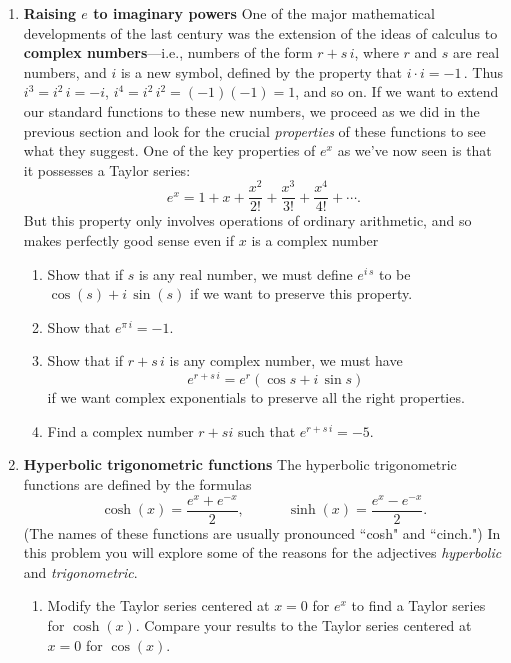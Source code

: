 \begin{enumerate}
\begin{enumerate}
\end{enumerate}
\item {\bf Raising $e$ to imaginary powers} One of the major mathematical developments of the
last century was the extension of the ideas of calculus to {\bf
  complex numbers}---i.e., numbers of the form
$r+s\,i$, where $r$ and $s$ are real numbers, and $i$ is a new symbol,
defined by the property that $i\cdot i=-1$\,.  Thus $i^3=i^2\,i=-i$,
$i^4=i^2\,i^2=(-1)(-1)=1$, and so on. If we want to extend our
standard functions to these new numbers, we proceed as we did in the
previous section and look for the crucial {\em properties} of these
functions to see what they suggest.  One of the key properties of
$e^x$ as we've now seen is that it possesses a Taylor series:
\[
e^x = 1 + x + \dfrac{x^2}{2!} + \dfrac{x^3}{3!} 
                + \dfrac{x^4}{4!} + \cdots .
\]
But this property only involves operations of ordinary arithmetic, and
so makes perfectly good sense even if $x$ is a complex number


  \begin{enumerate}
  \item Show that if $s$ is any real number, we must define $e^{i\,s}$ to
be $\cos(s)+i\,\sin(s)$ if we want to preserve this property.

  \item Show that $e^{\pi\,i}=-1$.

  \item Show that if $r+s\,i$ is any complex number, we must have
\[
e^{r+s\,i}=e^r(\cos{s}+i\,\sin{s})
\]
if we want complex exponentials to preserve all the right properties.

  \item Find a complex number $r+si$ such that $e^{r+s\,i}= -5$.


\end{enumerate}
\item {\bf Hyperbolic trigonometric functions}\index{$\cosh$}\index{$\sinh$} The hyperbolic trigonometric
functions are defined by the formulas
\[
\cosh(x) = \dfrac{e^x + e^{-x}}{2}, \qquad \quad
\sinh(x) = \dfrac{e^x - e^{-x}}{2}.
\]
(The names of these functions are usually pronounced ``cosh" and
``cinch.")  In this problem you will explore some of the reasons for
the adjectives {\em hyperbolic} and {\em trigonometric}.

  \begin{enumerate}
  \item Modify the Taylor series centered at $x=0$ for $e^x$ to find a
Taylor series for $\cosh(x)$.  Compare your results to the Taylor
series centered at $x=0$ for $\cos(x)$.


\end{enumerate}
\end{enumerate}
